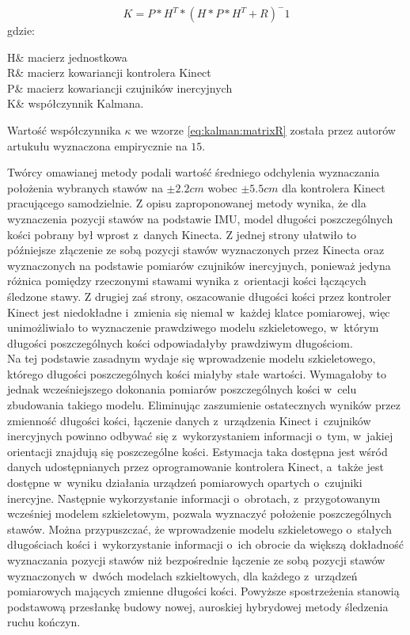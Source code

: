 \begin{equation}
	K = P * H^T * (H * P * H^T +R)^-1
	\label{eq:kalman:gain}
\end{equation}
gdzie:
\begin{conditions}
	H& macierz jednostkowa\\
	R& macierz kowariancji kontrolera Kinect\\
	P& macierz kowariancji czujników inercyjnych\\
	K& współczynnik Kalmana.
\end{conditions}
																																																			
Wartość współczynnika $\kappa$ we wzorze \ref{eq:kalman:matrixR} została przez autorów artukułu wyznaczona empirycznie na $15$.
																																																			
Twórcy omawianej metody podali wartość średniego odchylenia wyznaczania położenia wybranych stawów na $\pm 2.2cm$ wobec $\pm 5.5cm$ dla kontrolera Kinect pracującego samodzielnie. Z opisu zaproponowanej metody wynika, że dla wyznaczenia pozycji stawów na podstawie IMU, model długości poszczególnych kości pobrany był wprost z~danych Kinecta. Z jednej strony ułatwiło to późniejsze złączenie ze sobą pozycji stawów wyznaczonych przez Kinecta oraz wyznaczonych na podstawie pomiarów czujników inercyjnych, ponieważ jedyna różnica pomiędzy rzeczonymi stawami wynika z~orientacji kości łączących śledzone stawy. Z drugiej zaś strony, oszacowanie długości kości przez kontroler Kinect jest niedokładne i~zmienia się niemal w~każdej klatce pomiarowej, więc unimożliwiało to wyznaczenie prawdziwego modelu szkieletowego, w~którym długości poszczególnych kości odpowiadałyby prawdziwym długościom.\\
																																																			
Na tej podstawie zasadnym wydaje się wprowadzenie modelu szkieletowego, którego długości poszczególnych kości miałyby stałe wartości. Wymagałoby to jednak wcześniejszego dokonania pomiarów poszczególnych kości w~celu zbudowania takiego modelu. Eliminując zaszumienie ostatecznych wyników przez zmienność długości kości, łączenie danych z~urządzenia Kinect i~czujników inercyjnych powinno odbywać się z~wykorzystaniem informacji o~tym, w~jakiej orientacji znajdują się poszczególne kości. Estymacja taka dostępna jest wśród danych udostępnianych przez oprogramowanie kontrolera Kinect, a~także jest dostępne w~wyniku działania urządzeń pomiarowych opartych o~czujniki inercyjne. Następnie wykorzystanie informacji o~obrotach, z~przygotowanym wcześniej modelem szkieletowym, pozwala wyznaczyć położenie poszczególnych stawów. Można przypuszczać, że wprowadzenie modelu szkieletowego o~stałych długościach kości i~wykorzystanie informacji o~ich obrocie da większą dokładność wyznaczania pozycji stawów niż bezpośrednie łączenie ze sobą pozycji stawów wyznaczonych w~dwóch modelach szkieltowych, dla każdego z~urządzeń pomiarowych mających zmienne długości kości. Powyższe spostrzeżenia stanowią podstawową przesłankę budowy nowej, auroskiej hybrydowej metody śledzenia ruchu kończyn.